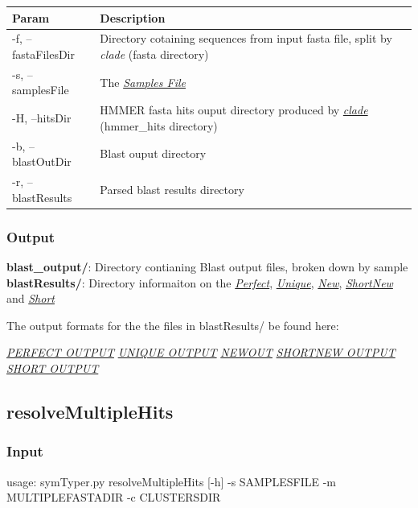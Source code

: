 \documentclass[letterpaper,10pt,english]{sphinxmanual}
\begin{document}
\begin{tabulary}{\linewidth}{|L|L|}
\hline
\textsf{\relax 
Param
} & \textsf{\relax 
Description
}\\
\hline
-f, --fastaFilesDir
 & 
Directory cotaining sequences from input fasta file, split by \emph{clade} (fasta directory)
\\

-s, --samplesFile
 & 
The {\hyperref[defs:samplefile]{\emph{Samples File}}}
\\

-H, --hitsDir
 & 
HMMER fasta hits ouput directory produced by {\hyperref[CommanLine:clade]{\emph{clade}}} (hmmer\_hits directory)
\\

-b, --blastOutDir
 & 
Blast ouput directory
\\

-r, --blastResults
 & 
Parsed blast results directory
\\
\hline\end{tabulary}



\subsubsection{Output}
\label{CommanLine:output}
\textbf{blast\_output/}: Directory contianing Blast output files, broken down by sample
\textbf{blastResults/}: Directory informaiton on the {\hyperref[defs:perfect]{\emph{Perfect}}}, {\hyperref[defs:unique]{\emph{Unique}}}, {\hyperref[defs:new]{\emph{New}}}, {\hyperref[defs:shortnew]{\emph{ShortNew}}} and {\hyperref[defs:short]{\emph{Short}}}

The output formats for the the files in blastResults/ be found here:

{\hyperref[defs:perfectout]{\emph{PERFECT OUTPUT}}}
{\hyperref[defs:uniqueout]{\emph{UNIQUE OUTPUT}}}
{\hyperref[defs:newout]{\emph{NEWOUT}}}
{\hyperref[defs:shortnewout]{\emph{SHORTNEW OUTPUT}}}
{\hyperref[defs:shortout]{\emph{SHORT OUTPUT}}}


\subsection{resolveMultipleHits}
\label{CommanLine:id4}\label{CommanLine:resolvemultiplehits}

\subsubsection{Input}
\label{CommanLine:id5}
usage: symTyper.py resolveMultipleHits {[}-h{]} -s SAMPLESFILE -m MULTIPLEFASTADIR -c CLUSTERSDIR
\end{document}
